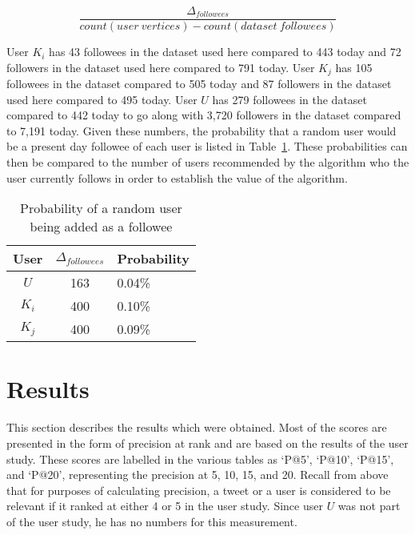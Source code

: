 \begin{center}
\[
\frac{\Delta_{followees} }{count(user\ vertices) - count(dataset\ followees)}
\]
\end{center}


User $K_{i}$ has 43 followees in the dataset used here compared to 443 today and 72 followers in the dataset used here compared to 791 today. User $K_{j}$ has 105 followees in the dataset compared to 505 today and 87 followers in the dataset used here compared to 495 today. User $U$ has 279 followees in the dataset compared to 442 today to go along with 3,720 followers in the dataset compared to 7,191 today. Given these numbers, the probability that a random user would be a present day followee of each user is listed in Table~\ref{tab:RandomUserFolloweeProb}. These probabilities can then be compared to the number of users recommended by the algorithm who the user currently follows in order to establish the value of the algorithm.

\begin{table}
\centering
\begin{tabular}{c|c|l}
{\bf User} & {\bf $\Delta_{followees}$ } & {\bf Probability} \\ \hline
$U$ & 163 &  0.04\%   \\ \hline
$K_{i}$ & 400 & 0.10\% \\ \hline
$K_{j}$ & 400 & 0.09\% \\
\end{tabular}
\caption{Probability of a random user being added as a followee}
\label{tab:RandomUserFolloweeProb}
\end{table}


\section{Results}

This section describes the results which were obtained. Most of the scores are presented in the form of precision at rank and are based on the results of the user study. These scores are labelled in the various tables as `P@5', `P@10', `P@15', and `P@20', representing the precision at 5, 10, 15, and 20. Recall from above that for purposes of calculating precision, a tweet or a user is considered to be relevant if it ranked at either 4 or 5 in the user study. Since user $U$ was not part of the user study, he has no numbers for this measurement.


